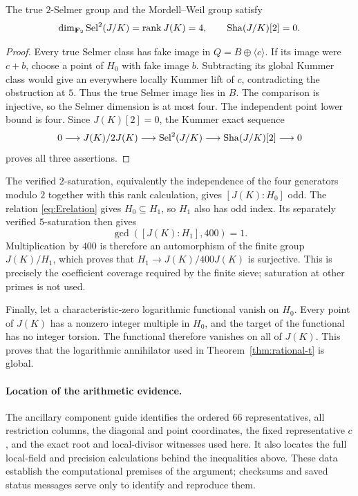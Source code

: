 \begin{proposition}
The true $2$-Selmer group and the Mordell--Weil group satisfy
\[
 \dim_{\mathbf F_2}\operatorname{Sel}^{2}(J/K)=\operatorname{rank} J(K)=4,
                         \qquad \mathop{\mathrm{Sha}}(J/K)[2]=0.
\]
\end{proposition}

\begin{proof}
Every true Selmer class has fake image in $Q=B\oplus\langle c\rangle$.
If its image were $c+b$, choose a point of $H_0$ with fake image $b$.
Subtracting its global Kummer class would give an everywhere locally
Kummer lift of $c$, contradicting the obstruction at $5$.
Thus the true Selmer image lies in $B$.  The comparison is injective,
so the Selmer dimension is at most four.  The independent point lower
bound is four.  Since $J(K)[2]=0$, the Kummer exact sequence
\[
 0\longrightarrow J(K)/2J(K)
 \longrightarrow\operatorname{Sel}^{2}(J/K)
 \longrightarrow\mathop{\mathrm{Sha}}(J/K)[2]\longrightarrow0
\]
proves all three assertions.
\end{proof}

The verified $2$-saturation, equivalently the independence of the four
generators modulo $2$ together with this rank calculation, gives
$[J(K):H_0]$ odd.  The relation \eqref{eq:Erelation} gives
$H_0\subseteq H_1$, so $H_1$ also has odd index.  Its separately
verified $5$-saturation then gives
\[
                         \gcd([J(K):H_1],400)=1.
\]
Multiplication by $400$ is therefore an automorphism of the finite
group $J(K)/H_1$, which proves that
$H_1\to J(K)/400J(K)$ is surjective.  This is precisely the coefficient
coverage required by the finite sieve; saturation at other primes
is not used.

Finally, let a characteristic-zero logarithmic functional vanish on
$H_0$.  Every point of $J(K)$ has a nonzero integer multiple in $H_0$,
and the target of the functional has no integer torsion.  The
functional therefore vanishes on all of $J(K)$.  This proves that the
logarithmic annihilator used in Theorem~\ref{thm:rational-t} is global.

\paragraph{Location of the arithmetic evidence.}
The ancillary component guide 
identifies the ordered $66$ representatives, all restriction columns,
the diagonal and point coordinates, the fixed representative $c$,
and the exact root and local-divisor witnesses used here.  It also
locates the full local-field and precision calculations behind the
inequalities above.  These data establish the computational premises
of the argument; checksums and saved status messages serve only to
identify and reproduce them.
